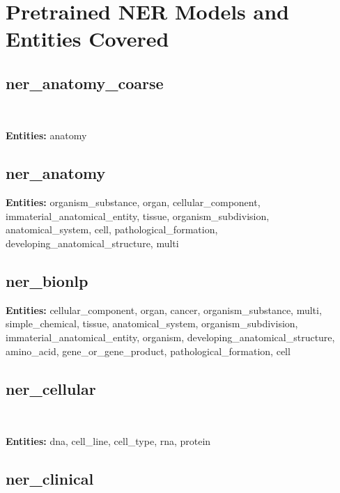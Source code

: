 \documentclass[letterpaper]{article} \usepackage{aaai21}  \usepackage{times}  \usepackage{helvet} \usepackage{courier}  \usepackage[hyphens]{url}  \usepackage{graphicx} \urlstyle{rm} \def\UrlFont{\rm}  \usepackage{natbib}  \usepackage{caption} \frenchspacing  \setlength{\pdfpagewidth}{8.5in}  \setlength{\pdfpageheight}{11in}  \usepackage{lscape}
\begin{document}
\section{Pretrained NER Models and Entities Covered}
\label{appendix:entities}

\subsection{ner\_anatomy\_coarse}

~\cite{pyysalo2014anatomical}

\textbf{Entities:} anatomy    

\subsection{ner\_anatomy}                          

\textbf{Entities:} organism\_substance, organ, cellular\_component, immaterial\_anatomical\_entity, tissue, organism\_subdivision, anatomical\_system, cell, pathological\_formation, developing\_anatomical\_structure, multi                                  

\subsection{ner\_bionlp}

\cite{nedellec2013overview}

\textbf{Entities:} cellular\_component, organ, cancer, organism\_substance, multi, simple\_chemical, tissue, anatomical\_system, organism\_subdivision, immaterial\_anatomical\_entity, organism, developing\_anatomical\_structure, amino\_acid, gene\_or\_gene\_product, pathological\_formation, cell                                                                       

\subsection{ner\_cellular} 

~\cite{kim2004introduction}

\textbf{Entities:} dna, cell\_line, cell\_type, rna, protein                                                                                    

\subsection{ner\_clinical}      
\end{document}
